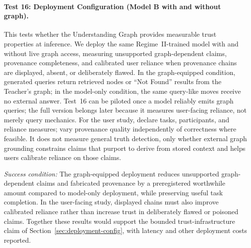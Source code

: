 \paragraph{Test 16: Deployment Configuration (Model B with and without graph).}
This tests whether the Understanding Graph provides measurable
trust properties at inference. We deploy the same Regime~II-trained model with
and without live graph access, measuring unsupported graph-dependent claims,
provenance completeness, and calibrated user reliance when provenance chains
are displayed, absent, or deliberately flawed.
In the graph-equipped condition, generated queries return retrieved nodes or
``Not Found'' results from the Teacher's graph; in the model-only condition,
the same query-like moves receive no external answer.
Test~16 can be piloted once a model reliably emits graph queries; the full
version belongs later because it measures user-facing reliance, not merely query
mechanics. For the user study, declare tasks, participants, and reliance measures;
vary provenance quality independently of correctness where feasible. It does not measure general truth detection,
only whether external graph grounding constrains claims that purport to derive
from stored context and helps users calibrate reliance on those claims.

\emph{Success condition:} The graph-equipped deployment reduces unsupported graph-dependent claims and fabricated provenance by a preregistered worthwhile amount compared to model-only deployment, while preserving useful task completion. In the user-facing study, displayed chains must also improve calibrated reliance rather than increase trust in deliberately flawed or poisoned claims. Together these results would support the bounded trust-infrastructure claim of Section~\ref{sec:deployment-config}, with latency and other deployment costs reported.


